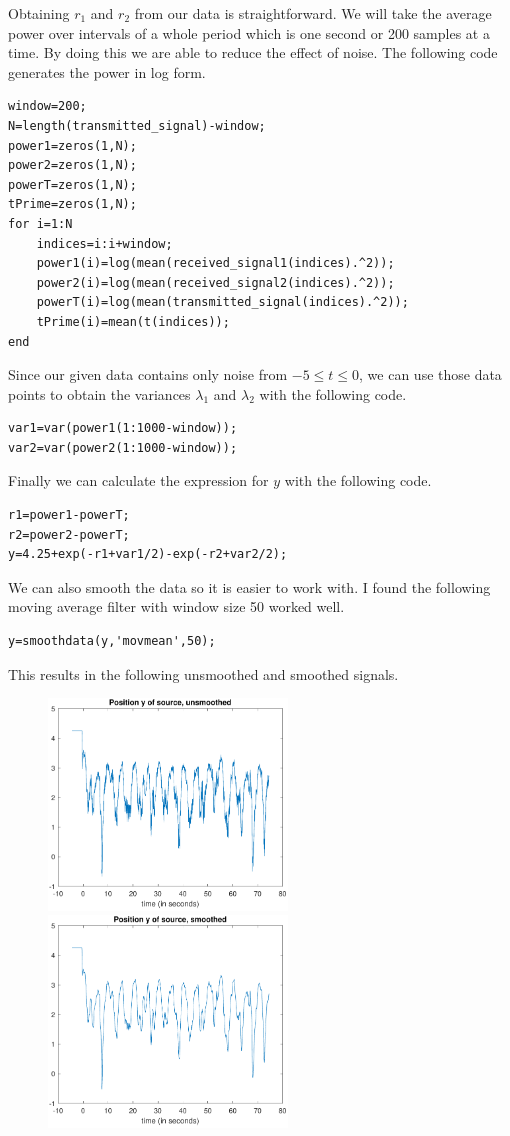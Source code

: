 \documentclass[12pt]{article}
\begin{document}
Obtaining \(r_1\) and \(r_2\) from our data is straightforward. We will take the average power over
intervals of a whole period which is one second or 200 samples at a time. By doing this we are able
to reduce the effect of noise. The following code generates the power in log form.
\begin{verbatim}
window=200;
N=length(transmitted_signal)-window;
power1=zeros(1,N);
power2=zeros(1,N);
powerT=zeros(1,N);
tPrime=zeros(1,N);
for i=1:N
    indices=i:i+window;
    power1(i)=log(mean(received_signal1(indices).^2));
    power2(i)=log(mean(received_signal2(indices).^2));
    powerT(i)=log(mean(transmitted_signal(indices).^2));
    tPrime(i)=mean(t(indices));
end
\end{verbatim}
Since our given data contains only noise from \(-5\leq t \leq 0\), we can use those data points to
obtain the variances \(\lambda_1\) and \(\lambda_2\) with the following code.
\begin{verbatim}
var1=var(power1(1:1000-window));
var2=var(power2(1:1000-window));
\end{verbatim}
Finally we can calculate the expression for \(y\) with the following code.
\begin{verbatim}
r1=power1-powerT;
r2=power2-powerT;
y=4.25+exp(-r1+var1/2)-exp(-r2+var2/2);
\end{verbatim}
We can also smooth the data so it is easier to work with. I found the following
moving average filter with window size 50 worked well.
\begin{verbatim}
y=smoothdata(y,'movmean',50);
\end{verbatim}
This results in the following unsmoothed and smoothed signals.
\begin{figure}[H]
    \begin{center}
        \includegraphics[width=2.5in]{y-unsmoothed.pdf}
        \includegraphics[width=2.5in]{y-smoothed.pdf}
    \end{center}
\end{figure}
\end{document}

